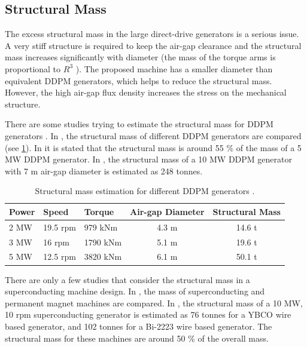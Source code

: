 \documentclass[12pt]{iopart}
\begin{document}
\subsection{Structural Mass}
The excess structural mass in the large direct-drive generators is a serious issue. A very stiff structure is required to keep the air-gap clearance and the structural mass increases significantly with diameter (the mass of the torque arms is proportional to $R^3$ \cite{McDonald2008b}). The proposed machine has a smaller diameter than equivalent DDPM generators, which helps to reduce the structural mass. However, the high air-gap flux density increases the stress on the mechanical structure.

There are some studies trying to estimate the structural mass for DDPM generators \cite{McDonald2008b, Zavvos2012}. In \cite{Bang2010}, the structural mass of different DDPM generators are compared (see \ref{DDPM_structural_mass}). In \cite{Bang2010a} it is stated that the structural mass is around 55 \% of the mass of a 5 MW DDPM generator. In \cite{Zavvos2012}, the structural mass of a 10 MW DDPM generator with 7 m air-gap diameter is estimated as 248 tonnes. 

\begin{table}[t]
  \centering
  \begin{tabular}{lllcc}
 Power & Speed & Torque & Air-gap Diameter & Structural Mass\\ 
 \hline
2 MW & 19.5 rpm & 979 kNm & 4.3 m & 14.6 t \\
3 MW & 16 rpm & 1790 kNm & 5.1 m & 19.6 t \\
5 MW & 12.5 rpm & 3820 kNm & 6.1 m & 50.1 t \\
\hline
 \end{tabular}
  \caption{Structural mass estimation for different DDPM generators \cite{Bang2010}.}
  \label{DDPM_structural_mass}
\end{table}

There are only a few studies that consider the structural mass in a superconducting machine design. In \cite{Maples2010}, the mass of superconducting and permanent magnet machines are compared. In \cite{Sung2013}, the structural mass of a 10 MW, 10 rpm superconducting generator is estimated as 76 tonnes for a YBCO wire based generator, and 102 tonnes for a Bi-2223 wire based generator. The structural mass for these machines are around 50 \% of the overall mass.
\end{document}
